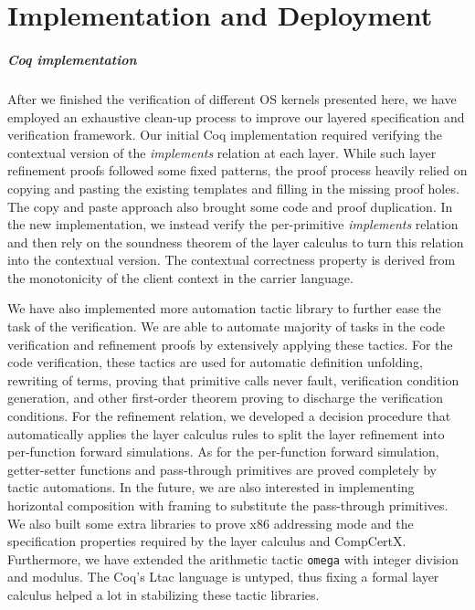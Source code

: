 
\chapter{Implementation and Deployment}
\label{chap-impl}

\paragraph{Coq implementation}

After we finished the verification of different OS kernels presented
here, we have employed an exhaustive clean-up process to improve our
layered specification and verification framework.  Our initial Coq
implementation required verifying the contextual version of the
{\em implements} relation at each layer.  While such layer refinement
proofs followed some fixed patterns, the proof process heavily relied
on copying and pasting the existing templates and filling in the
missing proof holes.  The copy and paste approach also brought some
code and proof duplication.  In the new implementation, we instead
verify the per-primitive {\em implements} relation and then rely on the
soundness theorem of the layer calculus to turn this relation into the
contextual version. The contextual correctness property is derived
from the monotonicity of the client context in the carrier language.

We have also implemented more automation tactic library to further
ease the task of the verification. We are able to automate majority of
tasks in the code verification and refinement proofs by extensively
applying these tactics. For the code verification, these tactics are
used for automatic definition unfolding, rewriting of terms, proving
that primitive calls never fault, verification condition generation,
and other first-order theorem proving to discharge the verification
conditions.  For the refinement relation, we developed a decision
procedure that automatically applies the layer calculus rules to split
the layer refinement into per-function forward simulations.  As for
the per-function forward simulation, getter-setter functions and
pass-through primitives are proved completely by tactic automations.
In the future, we are also interested in implementing horizontal
composition with framing to substitute the pass-through primitives.
We also built some extra libraries to prove x86 addressing mode and
the specification properties required by the layer calculus and
CompCertX.  Furthermore, we have extended the arithmetic
tactic \texttt{omega} with integer division and modulus.  The Coq's
Ltac language is untyped, thus fixing a formal layer calculus helped a
lot in stabilizing these tactic libraries.

